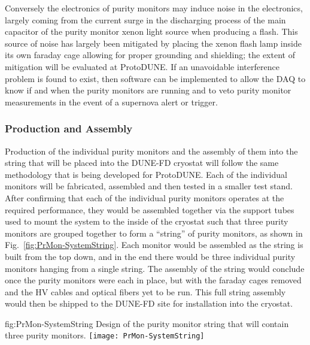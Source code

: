 Conversely the electronics of purity monitors may induce noise in the  electronics, largely coming from the current surge in the discharging process of the main capacitor of the purity monitor xenon light source when producing a flash.  This source of noise has largely been mitigated by placing the xenon flash lamp inside its own faraday cage allowing for proper grounding and shielding; the extent of mitigation will be evaluated at ProtoDUNE.
If an unavoidable interference problem is found to exist, then software can be implemented to allow the DAQ to know if and when the purity monitors are running and to veto purity monitor measurements in the event of a supernova alert or trigger. 


\subsubsection{Production and Assembly}
\label{sec:PrMon-Production-Assembly}
Production of the individual purity monitors and the assembly of them into the string that will be placed into the DUNE-FD cryostat will follow the same methodology that is being developed for ProtoDUNE.  Each of the individual monitors will be fabricated, assembled and then tested in a smaller test stand.  After confirming that each of the individual purity monitors operates at the required performance, they would be assembled together via the support tubes used to mount the system to the inside of the cryostat such that three purity monitors are grouped together to form a ``string'' of purity monitors, as shown in Fig.~\ref{fig:PrMon-SystemString}.
Each monitor would be assembled as the string is built from the top down, and in the end there would be three individual purity monitors hanging from a single string.  The assembly of the string would conclude once the purity monitors were each in place, but with the faraday cages removed and the HV cables and optical fibers yet to be run.  This full string assembly would then be shipped to the DUNE-FD site for installation into the cryostat.

\begin{dunefigure}{fig:PrMon-SystemString}
  {Design of the purity monitor string that will contain three purity monitors.}
  \texttt{[image: PrMon-SystemString]}
\end{dunefigure}





